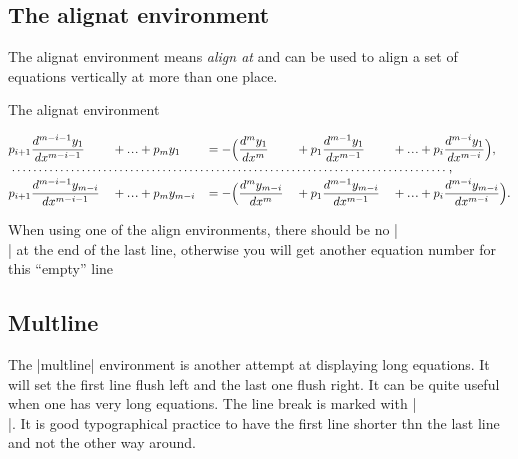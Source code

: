\subsection{The alignat environment}

The alignat environment means \emph{align at} and can be used to align a set of equations vertically at more than one place.



\begin{texexample}{The alignat environment}{}
\renewcommand{\dotsb}{\ldots}			%
\renewcommand{\dotsbsmall}{\ldot\!\ldot\!\ldot}
\renewcommand{\ldot}{\mathbin{.}}			%
\renewcommand{\nobf}[1]{\no \textbf{#1}}	

\begin{alignat*}{5}
  &p_{i+1}\dfrac{d^{m-i-1}y_1}{dx^{m-i-1}} &&+ \dotsbsmall +p_{m}y_1
  && = -\Big(\dfrac{d^{m}y_1}{dx^{m}} &&+p_1\dfrac{d^{m-1}y_1}{dx^{m-1}}
  &&+ \dotsbsmall +p_{i}\dfrac{d^{m-i}y_1}{dx^{m-i}}\Big), \\
\multispan{10}{\makebox[36em]{\dotfill},}\\
 &p_{i+1}\dfrac{d^{m-i-1}y_{m-i}}{dx^{m-i-1}} &&+ \dotsbsmall +p_{m}y_{m-i}\!
 &&= -\Big(\dfrac{d^{m}y_{m-i}}{dx^{m}} &&+ p_1\dfrac{d^{m-1}y_{m-i}}{dx^{m-1}}
 &&+ \dotsbsmall +p_{i}\dfrac{d^{m-i}y_{m-i}}{dx^{m-i}}\Big).
\end{alignat*}
\end{texexample}



When using one of the align environments, there should be no |\\| at the end of the
last line, otherwise you will get another equation number for this ``empty''  line



\clearpage
\subsection{Multline}
The |multline| environment is another attempt at displaying long equations. It will set the first line flush left and the last one flush right. It can be quite useful when one has very long equations. The line break is marked with |\\|. It is good typographical practice to have the first line shorter thn the last line and not the other way around.

